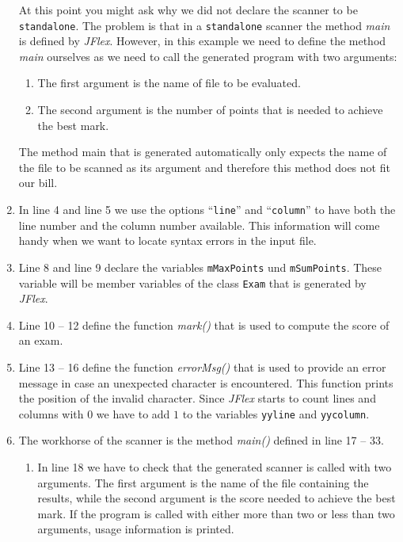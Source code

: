 \begin{enumerate}
      At this point you might ask why we did not declare the scanner to be \texttt{standalone}.
      The problem is that in a \texttt{standalone} scanner the method \textsl{main} is defined
      by \textsl{JFlex}.  However, in this example we need to define the method \textsl{main}
      ourselves as we need to call the generated program with two arguments:
      \begin{enumerate}
      \item The first argument is the name of file to be evaluated.
      \item The second argument is the number of points that is needed to achieve the best mark.
      \end{enumerate}
      The method main that is generated automatically only expects the name of the file to be
      scanned as its argument and therefore this method does not fit our bill.
\item In line 4 and line 5 we use the options ``\texttt{line}'' and
      ``\texttt{column}'' to have both the line number and the column number available.
      This information will come handy when we want to locate syntax errors in the input file.
\item Line 8 and line 9 declare the variables  \texttt{mMaxPoints} und
      \texttt{mSumPoints}.  These variable will be member variables of the class \texttt{Exam} that
      is generated by \textsl{JFlex}.
\item Line 10 -- 12 define the function \textsl{mark()} that is used to compute the score of an exam.
\item Line 13 -- 16 define the function \textsl{errorMsg()} that is used to provide an error message
      in case an unexpected character is encountered.  This function prints the position of the
      invalid character.  Since \textsl{JFlex} starts to count lines and columns with 0 we have to
      add $1$ to the variables \texttt{yyline} and \texttt{yycolumn}.
\item The workhorse of the scanner is the method \textsl{main()} defined in line 17 -- 33.
      \begin{enumerate}
      \item In line 18 we have to check that the generated scanner is called with two arguments.
            The first argument is the name of the file containing the results, while the second
            argument is the score needed to achieve the best mark.  If the program is called with
            either more than two or less than two arguments, usage information is printed.

\end{enumerate}
\end{enumerate}
